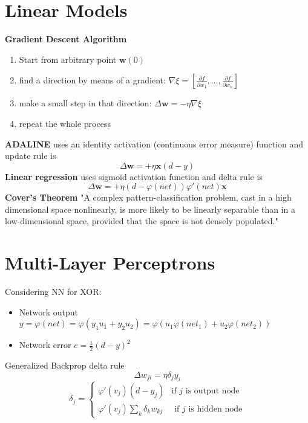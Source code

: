 \documentclass[11pt, twocolumn]{article}
\begin{document}
\section{Linear Models}
\footnotesize
\textbf{Gradient Descent Algorithm}
\begin{enumerate}
	\item Start from arbitrary point $\mathbf{w}(0)$
	\item find a direction by means of a gradient: $\nabla\xi = [\frac{\partial f}{\partial w_1}, \dots, \frac{\partial f}{\partial w_n}]$
	\item make a small step in that direction: $\Delta\mathbf{w} = -\eta\nabla\xi$
	\item repeat the whole process
\end{enumerate}
\normalsize
\textbf{ADALINE} uses an identity activation (continuous error measure) function and update rule is
$$\Delta\mathbf{w} = + \eta\mathbf{x}(d-y)$$
\textbf{Linear regression} uses sigmoid activation function and delta rule is
$$\Delta\mathbf{w} = + \eta(d-\varphi(net))\varphi'(net)\mathbf{x}$$
\textbf{Cover's Theorem} "A complex pattern-classification problem, cast in a high dimensional space nonlinearly, is more likely to be linearly separable than in a low-dimensional space, provided that the space is not densely populated."

\section{Multi-Layer Perceptrons}
Considering NN for XOR:
\begin{itemize}
	\item Network output $y = \varphi(net) = \varphi(y_1u_1 + y_2u_2) = \varphi(u_1\varphi(net_1) + u_2\varphi(net_2))$
	\item Network error $e = \frac{1}{2}(d-y)^2$
\end{itemize}
Generalized Backprop delta rule
$$\Delta w_{ji} = \eta \delta_j y_i$$
$$
\delta_j = \begin{cases} \varphi '(v_j)(d-y_j) & \mbox{if }j\mbox{ is output node} \\
 \varphi '(v_j)\sum_{k} \delta_k w_{kj} & \mbox{ if }j\mbox{ is hidden node} \end{cases}
$$
\end{document}
